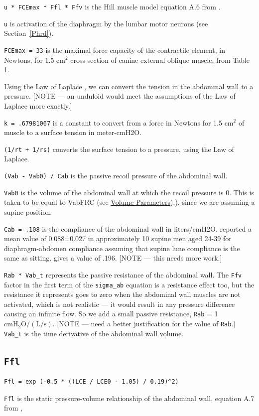 \documentclass[12pt,openany,oneside]{book}
\begin{document}
\verb~u * FCEmax * Ffl * Ffv~ is the Hill muscle model equation A.6
from \citet{Ratnovsky20031771}.

\verb~u~ is activation of the diaphragm by the lumbar motor neurons
(see Section~\ref{Phrd}).

\verb~FCEmax = 33~ is the maximal force capacity of the contractile
element, in Newtons, for 1.5 cm$^2$ cross-section of canine external
oblique muscle, from \citet{Ratnovsky20031771} Table 1.

Using the Law of Laplace \citep{laplace1808traite}, we can convert the
tension in the abdominal wall to a pressure.  [NOTE --- an unduloid
would meet the assumptions of the Law of Laplace more exactly.]

\verb~k = .67981067~ is a constant to convert from a force in Newtons
for 1.5 cm$^2$ of muscle to a surface tension in meter-cmH2O.

\verb~(1/rt + 1/rs)~ converts the surface tension to a pressure, using
the Law of Laplace.

\verb~(Vab - Vab0) / Cab~ is the passive recoil pressure of the
abdominal wall.

\verb~Vab0~ is the volume of the abdominal wall at which the recoil
pressure is 0.  This is taken to be equal to VabFRC
(see \hyperref[Volume Parameters]{Volume Parameters}).), since we are
assuming a supine position.

\verb~Cab = .108~ is the compliance of the abdominal wall in
liters/cmH2O.  \citet{Estenne1985} reported a mean value of
0.088±0.027 in approximately 10 supine men aged 24-39 for
diaphragm-abdomen compliance assuming that supine lune compliance is
the same as sitting.  \citet{Cala01031993} gives a value of .196.
[NOTE --- this needs more work.]

\verb~Rab * Vab_t~ represents the passive resistance of the abdominal
wall.  The \verb~Ffv~ factor in the first term of the \verb~sigma_ab~
equation is a resistance effect too, but the resistance it represents
goes to zero when the abdominal wall muscles are not activated, which
is not realistic --- it would result in any pressure difference
causing an infinite flow.  So we add a small passive resistance,
\verb~Rab~ = 1 $\mathrm{cmH_2O/(L/s)}$.  [NOTE --- need a better
justification for the value of \verb~Rab~.]  \verb~Vab_t~ is the time
derivative of the abdominal wall volume.

\subsection{\texttt{Ffl}}
\begin{verbatim}
Ffl = exp (-0.5 * ((LCE / LCE0 - 1.05) / 0.19)^2)
\end{verbatim}
\verb~Ffl~ is the static pressure-volume relationship of the
abdominal wall, equation A.7 from \citet{Ratnovsky20031771}, 
\end{document}
